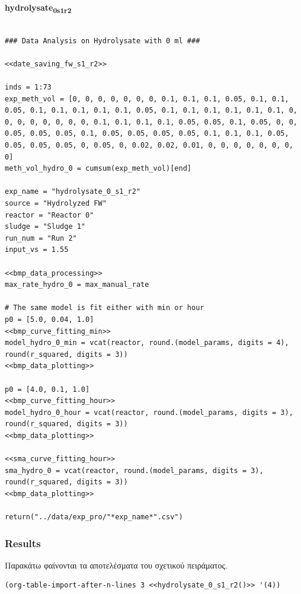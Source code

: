 \documentclass[11pt]{article}
\begin{document}
\textbf{hydrolysate\textsubscript{0}\textsubscript{s1}\textsubscript{r2}}
\begin{verbatim}

### Data Analysis on Hydrolysate with 0 ml ###

<<date_saving_fw_s1_r2>>

inds = 1:73
exp_meth_vol = [0, 0, 0, 0, 0, 0, 0, 0.1, 0.1, 0.1, 0.05, 0.1, 0.1, 0.05, 0.1, 0.1, 0.1, 0.1, 0.1, 0.05, 0.1, 0.1, 0.1, 0.1, 0.1, 0.1, 0, 0, 0, 0, 0, 0, 0, 0, 0.1, 0.1, 0.1, 0.1, 0.05, 0.05, 0.1, 0.05, 0, 0, 0.05, 0.05, 0.05, 0.1, 0.05, 0.05, 0.05, 0.05, 0.1, 0.1, 0.1, 0.05, 0.05, 0.05, 0.05, 0, 0.05, 0, 0.02, 0.02, 0.01, 0, 0, 0, 0, 0, 0, 0, 0]
meth_vol_hydro_0 = cumsum(exp_meth_vol)[end]

exp_name = "hydrolysate_0_s1_r2"
source = "Hydrolyzed FW"
reactor = "Reactor 0"
sludge = "Sludge 1"
run_num = "Run 2"
input_vs = 1.55

<<bmp_data_processing>>
max_rate_hydro_0 = max_manual_rate

# The same model is fit either with min or hour
p0 = [5.0, 0.04, 1.0]
<<bmp_curve_fitting_min>>
model_hydro_0_min = vcat(reactor, round.(model_params, digits = 4), round(r_squared, digits = 3))
<<bmp_data_plotting>>

p0 = [4.0, 0.1, 1.0]
<<bmp_curve_fitting_hour>>
model_hydro_0_hour = vcat(reactor, round.(model_params, digits = 3), round(r_squared, digits = 3))
<<bmp_data_plotting>>

<<sma_curve_fitting_hour>>
sma_hydro_0 = vcat(reactor, round.(model_params, digits = 3), round(r_squared, digits = 3))
<<bmp_data_plotting>>

return("../data/exp_pro/"*exp_name*".csv")
\end{verbatim}

\subsubsection{Results}
\label{sec:orgf7bc494}
Παρακάτω φαίνονται τα αποτελέσματα του σχετικού πειράματος.

\begin{verbatim}
(org-table-import-after-n-lines 3 <<hydrolysate_0_s1_r2()>> '(4))
\end{verbatim}
\end{document}
